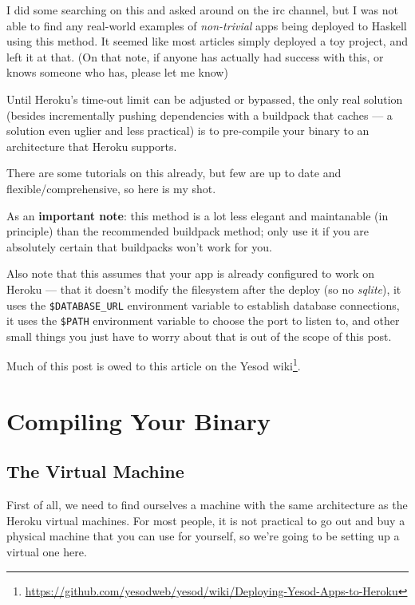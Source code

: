 \documentclass[]{article}
\renewcommand{\href}[2]{#2\footnote{\url{#1}}}
\begin{document}
I did some searching on this and asked around on the irc channel, but I was not
able to find any real-world examples of \emph{non-trivial} apps being deployed
to Haskell using this method. It seemed like most articles simply deployed a toy
project, and left it at that. (On that note, if anyone has actually had success
with this, or knows someone who has, please let me know)

Until Heroku's time-out limit can be adjusted or bypassed, the only real
solution (besides incrementally pushing dependencies with a buildpack that
caches --- a solution even uglier and less practical) is to pre-compile your
binary to an architecture that Heroku supports.

There are some tutorials on this already, but few are up to date and
flexible/comprehensive, so here is my shot.

As an \textbf{important note}: this method is a lot less elegant and maintanable
(in principle) than the recommended buildpack method; only use it if you are
absolutely certain that buildpacks won't work for you.

Also note that this assumes that your app is already configured to work on
Heroku --- that it doesn't modify the filesystem after the deploy (so no
\emph{sqlite}), it uses the \texttt{\$DATABASE\_URL} environment variable to
establish database connections, it uses the \texttt{\$PATH} environment variable
to choose the port to listen to, and other small things you just have to worry
about that is out of the scope of this post.

Much of this post is owed to
\href{https://github.com/yesodweb/yesod/wiki/Deploying-Yesod-Apps-to-Heroku}{this
article on the Yesod wiki}.

\hypertarget{compiling-your-binary}{%
\section{Compiling Your Binary}\label{compiling-your-binary}}

\hypertarget{the-virtual-machine}{%
\subsection{The Virtual Machine}\label{the-virtual-machine}}

First of all, we need to find ourselves a machine with the same architecture as
the Heroku virtual machines. For most people, it is not practical to go out and
buy a physical machine that you can use for yourself, so we're going to be
setting up a virtual one here.
\end{document}
